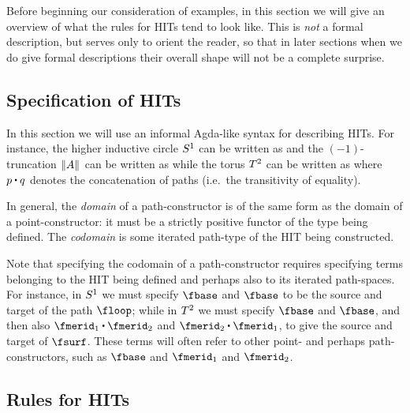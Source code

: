 \documentclass{amsart}
\begin{document}
Before beginning our consideration of examples, in this section we will give an overview of what the rules for HITs tend to look like.
This is \emph{not} a formal description, but serves only to orient the reader, so that in later sections when we do give formal descriptions their overall shape will not be a complete surprise.


\subsection{Specification of HITs}
\label{sec:hit-specs}

In this section we will use an informal Agda-like syntax for describing HITs.
For instance, the higher inductive circle $S^1$ can be written as
\indef{\circtype}{
  \fbase : \circtype \OR
  \floop : \id[\circtype]{\fbase}{\fbase}
}
and the $(-1)$-truncation $\mathopen{}\left\Vert A\right\Vert_{}\mathclose{}$ can be written as
while the torus $T^2$ can be written as
where $p\ct q$ denotes the concatenation of paths (i.e.\ the transitivity of equality).

In general, the \emph{domain} of a path-constructor is of the same form as the domain of a point-constructor: it must be a strictly positive functor of the type being defined.
The \emph{codomain} is some iterated path-type of the HIT being constructed.

Note that specifying the codomain of a path-constructor requires specifying terms belonging to the HIT being defined and perhaps also to its iterated path-spaces.
For instance, in $S^1$ we must specify $\fbase$ and $\fbase$ to be the source and target of the path $\floop$; while in $T^2$ we must specify $\fbase$ and $\fbase$, and then also ${\fmerid_1 \ct \fmerid_2}$ and ${\fmerid_2 \ct \fmerid_1}$, to give the source and target of $\fsurf$.
These terms will often refer to other point- and perhaps path-constructors, such as $\fbase$ and $\fmerid_1$ and $\fmerid_2$.

\subsection{Rules for HITs}
\label{sec:rules}
\end{document}
